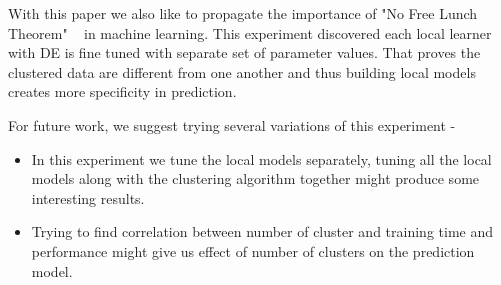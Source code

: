 \documentclass[sigconf]{acmart}
\theoremstyle{break}
\begin{document}
    With this paper we also like to propagate the importance of "No Free Lunch Theorem" ~\cite{wolpert1997no} in machine learning. This experiment discovered each local learner with DE is fine tuned with separate set of parameter values. That proves the clustered data are different from one another and thus building local models creates more specificity in prediction. 
    
    
    For future work, we suggest trying several variations of this experiment - 
    
    \begin{itemize}
        \item In this experiment we tune the local models separately, tuning all the local models along with the clustering algorithm together might produce some interesting results.
        \item Trying to find correlation between number of cluster and training time and performance might give us effect of number of clusters on the prediction model.
    \end{itemize}
    


 
\end{document}
